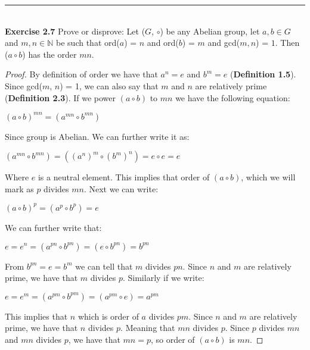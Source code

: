 \documentclass{article}
\begin{document}
\noindent\rule{12cm}{0.4pt}\\
\noindent \textbf{Exercise 2.7} Prove or disprove: Let ($G$, $\circ$) be any Abelian group, let $a, b \in G$ and $m,n \in \mathbb{N}$ be such that ord($a$) = $n$ and ord($b$) = $m$ and gcd($m,n$) = $1$. Then ($a \circ b$) has the order $mn$.
\begin{proof}
By definition of order we have that $a^n=e$ and $b^m=e$ (\textbf{Definition 1.5}). Since gcd($m$, $n$) = 1, we can also say that $m$ and $n$ are relatively prime (\textbf{Definition 2.3}). If we power $(a \circ b)$ to $mn$ we have the following equation:
\begin{center}
$(a \circ b)^{mn}=(a^{mn} \circ b^{mn})$
\end{center}
Since group is Abelian. We can further write it as:
\begin{center}
$(a^{mn} \circ b^{mn})=((a^n)^m \circ (b^m)^n)=e \circ e=e$
\end{center}
Where $e$ is a neutral element. This implies that order of $(a \circ b)$, which we will mark as $p$ divides $mn$. Next we can write:
\begin{center}
$(a \circ b)^p=(a^{p} \circ b^{p})=e$
\end{center}
We can further write that:
\begin{center}
$e=e^n=(a^{pn} \circ b^{pn})= (e \circ b^{pn}) =b^{pn}$
\end{center}
From $b^{pn}=e=b^m$ we can tell that $m$ divides $pn$. Since $n$ and $m$ are relatively prime, we have that $m$ divides $p$. Similarly if we write:
\begin{center}
$e = e^m=(a^{pm} \circ b^{pm})= (a^{pm} \circ e) =a^{pm}$
\end{center}
This implies that $n$ which is order of $a$ divides $pm$. Since $n$ and $m$ are relatively prime, we have that $n$ divides $p$. Meaning that $mn$ divides $p$. Since $p$ divides $mn$ and $mn$ divides $p$, we have that $mn=p$, so order of $(a \circ b)$ is $mn$.
\end{proof}
\end{document}
